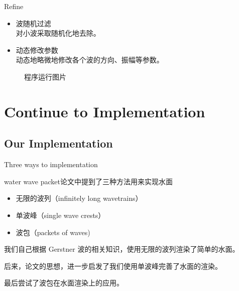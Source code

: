 \documentclass[handout,t]{beamer}
\begin{document}
\begin{frame}{Refine}
  \begin{itemize}
    \item 波随机过滤\\
    对小波采取随机化地去除。
    \item 动态修改参数\\
    动态地略微地修改各个波的方向、振幅等参数。
  \end{itemize}

  \begin{figure}[thpb]
    \centering
  \caption{程序运行图片}\label{fig:show}
  \end{figure}


\end{frame}


\section{Continue to Implementation}

\subsection{Our Implementation}


\begin{frame}{Three ways to implementation}
  
water wave packet论文中提到了三种方法用来实现水面
  
  \begin{itemize}
    \item 无限的波列（infinitely long wavetrains）
    \item 单波峰（single wave crests）
    \item 波包（packets of waves)
  \end{itemize}
  
我们自己根据 Gerstner 波的相关知识，使用无限的波列渲染了简单的水面。
  
后来，论文的思想，进一步启发了我们使用单波峰完善了水面的渲染。

最后尝试了波包在水面渲染上的应用。

\end{frame}
\end{document}
